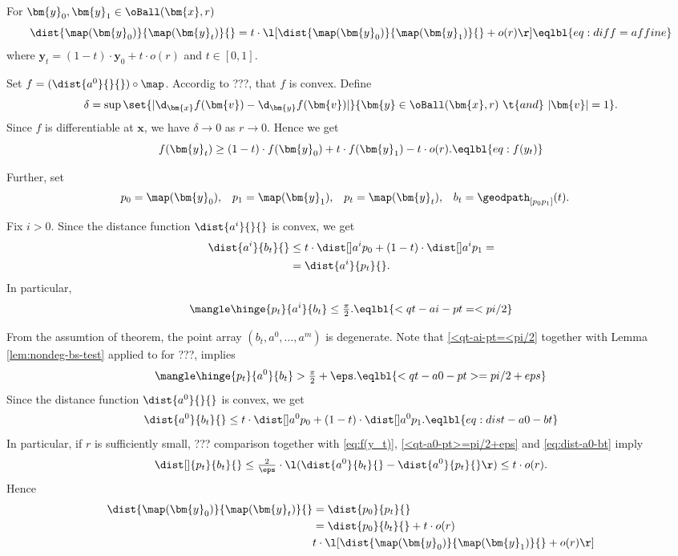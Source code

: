\begin{clm}{}\label{clm:almost-affine}
For $\bm{y}_0,\bm{y}_1\in\oBall(\bm{x},r)$
\[\dist{\map(\bm{y}_0)}{\map(\bm{y}_t)}{}
=
t
\cdot
\l[
\dist{\map(\bm{y}_0)}{\map(\bm{y}_1)}{}
+
o(r)
\r]
\eqlbl{eq:diff=affine}
\]
where 
$\bm{y}_t=(1-t)\cdot \bm{y}_0+t\cdot o(r)$ and $t\in [0,1]$.
\end{clm}

Set $f=(\dist{a^0}{}{})\circ\map$.
Accordig to ???,
that $f$ is convex.
Define
\[\delta
=
\sup
\set{|\d_{\bm{x}}f(\bm{v})-\d_{\bm{y}}f(\bm{v})|}%
{\bm{y}\in\oBall(\bm{x},r)\ \t{and}\ |\bm{v}|=1}.\]
Since $f$ is differentiable at $\bm{x}$,
we have $\delta\to 0$ as $r\to0$.
Hence we get 
\[f(\bm{y}_t)
\ge 
(1-t)\cdot f(\bm{y}_0)+t\cdot f(\bm{y}_1)-t\cdot o(r).
\eqlbl{eq:f(y_t)}\]

Further, set 
\begin{align*}
 p_0&=\map(\bm{y}_0),
&p_1&=\map(\bm{y}_1),
&p_t&=\map(\bm{y}_t),
&b_t&=\geodpath_{[p_0p_1]}(t).
\end{align*}

Fix $i>0$.
Since the distance function $\dist{a^i}{}{}$ is convex, 
we get
\begin{align*}
 \dist{a^i}{b_t}{}
&\le 
t\cdot\dist[{{}}]{a^i}{p_0}{}
+
(1-t)\cdot\dist[{{}}]{a^i}{p_1}{}=
\\
&=\dist{a^i}{p_t}{}.
\end{align*}
In particular,
\[ \mangle\hinge{p_t}{a^i}{b_t}\le \tfrac\pi2.
\eqlbl{<qt-ai-pt=<pi/2}\]

From the assumtion of theorem,
the point array $(b_t,a^0,\dots,a^m)$ is degenerate.
Note that \ref{<qt-ai-pt=<pi/2}
together with Lemma \ref{lem:nondeg-bs-test} applied to for ???,
implies
\[\mangle\hinge{p_t}{a^0}{b_t}>\tfrac\pi2+\eps.
\eqlbl{<qt-a0-pt>=pi/2+eps}\]
Since the distance function $\dist{a^0}{}{}$ is convex, 
we get
\[
\dist{a^0}{b_t}{}
\le 
t\cdot\dist[{{}}]{a^0}{p_0}{}
+
(1-t)\cdot\dist[{{}}]{a^0}{p_1}{}.
\eqlbl{eq:dist-a0-bt}
\]
In particular, if $r$ is sufficiently small, 
??? comparison 
together with \ref{eq:f(y_t)}, \ref{<qt-a0-pt>=pi/2+eps} and \ref{eq:dist-a0-bt} 
imply
\[\dist[]{p_t}{b_t}{}
\le 
\tfrac{2}{\eps}\cdot\l( \dist{a^0}{b_t}{}-\dist{a^0}{p_t}{}\r)\le t\cdot o(r).\]
Hence 
\begin{align*}
\dist{\map(\bm{y}_0)}{\map(\bm{y}_t)}{}
&=\dist{p_0}{p_t}{}
\\
&=\dist{p_0}{b_t}{}+t\cdot o(r)
\\
&
t
\cdot
\l[
\dist{\map(\bm{y}_0)}{\map(\bm{y}_1)}{}
+
o(r)
\r] 
\end{align*}
\claimqedsf

